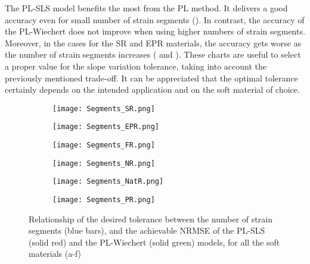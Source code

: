The PL-SLS model benefits the most from the PL method. It delivers a good accuracy even for small number of strain segments (). In contrast, the accuracy of the PL-Wiechert does not improve when using higher numbers of strain segments. Moreover, in the cases for the SR and EPR materials, the accuracy gets worse as the number of strain segments increases ( and ). These charts are useful to select a proper value for the slope variation tolerance, taking into account the previously mentioned trade-off. It can be appreciated that the optimal tolerance certainly depends on the intended application and on the soft material of choice.

\begin{figure}[htb!]
    \centering
    \begin{subfigure}[b]{0.49\textwidth}
        \centering
        \texttt{[image: Segments\_SR.png]}
        \caption{}
        \label{fig:SegmentsSR}
    \end{subfigure}
    \begin{subfigure}[b]{0.49\textwidth}
        \centering
        \texttt{[image: Segments\_EPR.png]}
        \caption{}
        \label{fig:SegmentsEPR}
    \end{subfigure}
    \begin{subfigure}[b]{0.49\textwidth}
        \centering
        \texttt{[image: Segments\_FR.png]}
        \caption{}
        \label{fig:SegmentsFR}
    \end{subfigure}
    \begin{subfigure}[b]{0.49\textwidth}
        \centering
        \texttt{[image: Segments\_NR.png]}
        \caption{}
        \label{fig:SegmentsNR}
    \end{subfigure}
    \begin{subfigure}[b]{0.49\textwidth}
        \centering
        \texttt{[image: Segments\_NatR.png]}
        \caption{}
        \label{fig:SegmentsNatR}
    \end{subfigure}
    \begin{subfigure}[b]{0.49\textwidth}
        \centering
        \texttt{[image: Segments\_PR.png]}
        \caption{}
        \label{fig:SegmentsPR}
    \end{subfigure}
    \caption{Relationship of the desired tolerance between the number of strain segments (blue bars), and the achievable NRMSE of the PL-SLS (solid red) and the PL-Wiechert (solid green) models, for all the soft materials (a-f) \cite{solis2018assessment}}
    \label{fig:SegmentsAll}
\end{figure}

